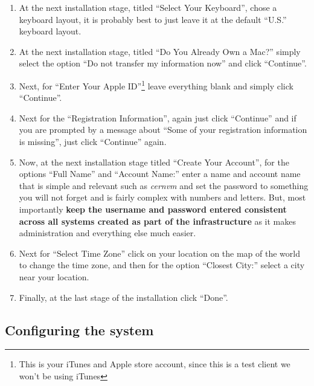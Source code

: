 \begin{enumerate}
\item 	At the next installation stage, titled ``Select Your Keyboard'', chose a keyboard layout, it is probably best to just leave
		it at the default ``U.S.'' keyboard layout.
		
\item	At the next installation stage, titled ``Do You Already Own a Mac?'' simply select the option ``Do not transfer my information
		now'' and click ``Continue''.
		
\item	Next, for ``Enter Your Apple ID''\footnote{This is your iTunes and Apple store account, since this is a test client we won't
		be using iTunes} leave everything blank and simply click ``Continue''.
		
\item	Next for the ``Registration Information'', again just click ``Continue'' and if you are prompted by a message about ``Some
		of your registration information is missing'', just click ``Continue'' again.
		
\item	Now, at the next installation stage titled ``Create Your Account'', for the options ``Full Name'' and ``Account Name:''
		enter a name and account name that is simple and relevant such as \emph{cernvm} and set the password to something you will
		not forget and is fairly complex with numbers and letters. But, most importantly {\bf keep the username and password entered
		consistent across all systems created as part of the infrastructure} as it makes administration and everything else much easier. 
		
\item	Next for ``Select Time Zone'' click on your location on the map of the world to change the time zone, and then for the option
		``Closest City:'' select a city near your location.
		
\item	Finally, at the last stage of the installation click ``Done''.	
\end{enumerate}




\subsection{Configuring the system}
\label{sec:osxconfig}

